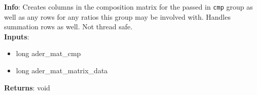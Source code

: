 \textbf{Info}: Creates columns in the composition matrix for the passed in
\texttt{cmp} group as well as any rows for any ratios this group may be involved
with. Handles summation rows as well. Not thread safe. \\

\noindent \textbf{Inputs}:
\begin{itemize}
\item{long ader\_mat\_cmp}
\item{long ader\_mat\_matrix\_data}
\end{itemize}

\noindent \textbf{Returns}: void
